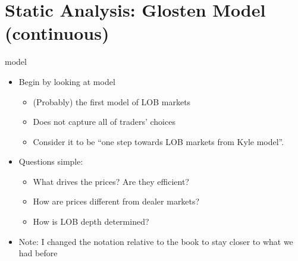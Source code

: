 \documentclass[english,10pt
,aspectratio=169
]{beamer}
\begin{document}



\section{Static Analysis: Glosten Model (continuous)}

\begin{frame}{\cite{glosten_is_1994} model}
	\begin{itemize}
		\item Begin by looking at \cite{glosten_is_1994} model
		\begin{itemize}
			\item (Probably) the first model of LOB markets
			\item Does not capture all of traders' choices
			\item Consider it to be ``one step towards LOB markets from Kyle model''.
		\end{itemize}
		\item Questions simple:
		\begin{itemize}
			\item What drives the prices? Are they efficient?
			\item How are prices different from dealer markets?
			\item How is LOB depth determined?
		\end{itemize}
		\item Note: I changed the notation relative to the book to stay closer to what we had before
	\end{itemize}
\end{frame}
\end{document}
